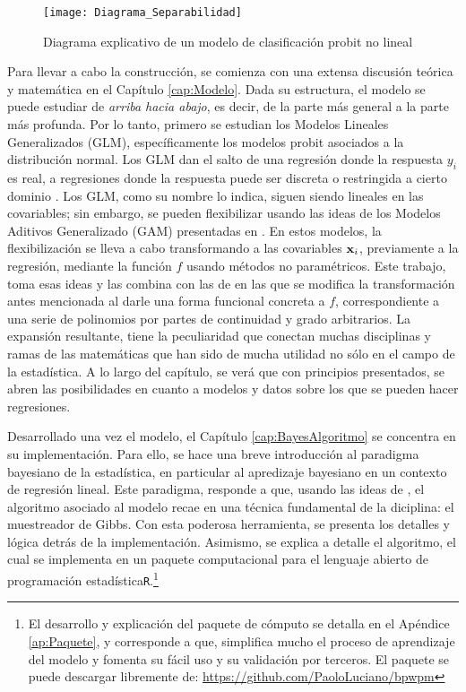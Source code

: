 \documentclass[../Main/Main.tex]{subfiles}
\begin{document}
\begin{figure}[h]
  \centering
      \texttt{[image: Diagrama\_Separabilidad]}
  \caption{Diagrama explicativo de un modelo de clasificación probit no lineal}
  \label{fig:DiagramaIntro}
\end{figure}

Para llevar a cabo la construcción, se comienza con una extensa discusión teórica y matemática en el Capítulo \ref{cap:Modelo}. Dada su estructura, el modelo se puede estudiar de \textit{arriba hacia abajo}, es decir, de la parte más general a la parte más profunda. Por lo tanto, primero se estudian los Modelos Lineales Generalizados (GLM), específicamente los modelos probit asociados a la distribución normal. Los GLM dan el salto de una regresión donde la respuesta $y_i$ es real, a regresiones donde la respuesta puede ser discreta o restringida a cierto dominio \autocite{maccullagh1989generalized}. Los GLM, como su nombre lo indica, siguen siendo lineales en las covariables; sin embargo, se pueden flexibilizar usando las ideas de los Modelos Aditivos Generalizado (GAM) presentadas en \citet{hastie1986generalized}. En estos modelos, la flexibilización se lleva a cabo transformando a las covariables $\mathbf{x}_i$, previamente a la regresión, mediante la función $f$ usando métodos no paramétricos. Este trabajo, toma esas ideas y las combina con las de \citet{mallik1998automatic} en las que se modifica la transformación antes mencionada al darle una forma funcional concreta a $f$, correspondiente a una serie de polinomios por partes de continuidad y grado arbitrarios. La expansión resultante, tiene la peculiaridad que conectan muchas disciplinas y ramas de las matemáticas que han sido de mucha utilidad no sólo en el campo de la estadística. A lo largo del capítulo, se verá que con principios presentados, se abren las posibilidades en cuanto a modelos y datos sobre los que se pueden hacer regresiones. 

Desarrollado una vez el modelo, el Capítulo \ref{cap:BayesAlgoritmo} se concentra en su implementación. Para ello, se hace una breve introducción al paradigma bayesiano de la estadística, en particular al apredizaje bayesiano en un contexto de regresión lineal. Este paradigma, responde a que, usando las ideas de \citet{albert1993bayesian}, el algoritmo asociado al modelo recae en una técnica fundamental de la diciplina: el muestreador de Gibbs. Con esta poderosa herramienta, se presenta los detalles y lógica detrás de la implementación. Asimismo, se explica a detalle el algoritmo, el cual se implementa en un paquete computacional para el lenguaje abierto de programación estadística\verb|R|.\footnote{El desarrollo y explicación del paquete de cómputo se detalla en el Apéndice \ref{ap:Paquete}, y corresponde a que, simplifica mucho el proceso de aprendizaje del modelo y fomenta su fácil uso y su validación por terceros. El paquete se puede descargar libremente de: \url{https://github.com/PaoloLuciano/bpwpm}}
\end{document}
